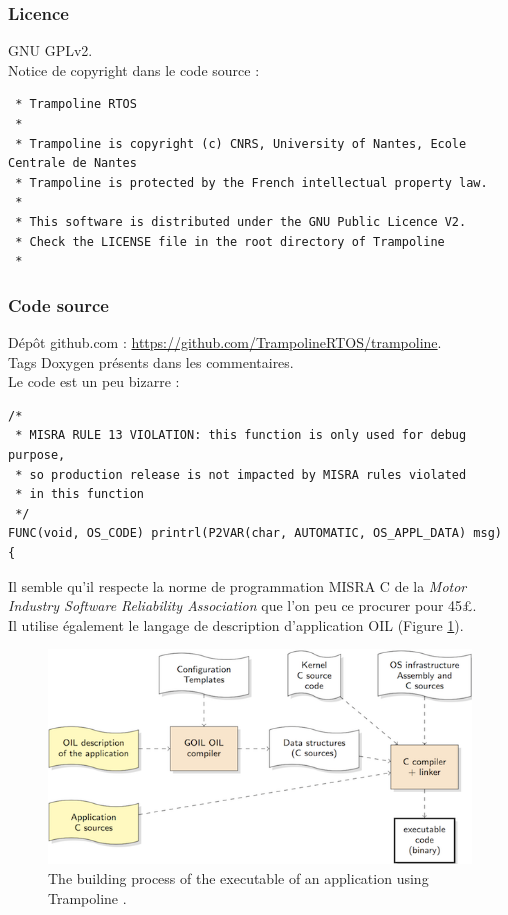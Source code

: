 \subsubsection{Licence}
GNU GPLv2.\\

Notice de copyright dans le code source :
{\small
\begin{verbatim}
 * Trampoline RTOS
 *
 * Trampoline is copyright (c) CNRS, University of Nantes, Ecole Centrale de Nantes
 * Trampoline is protected by the French intellectual property law.
 *
 * This software is distributed under the GNU Public Licence V2.
 * Check the LICENSE file in the root directory of Trampoline
 *
\end{verbatim}
}

\subsubsection{Code source}
Dépôt github.com : \url{https://github.com/TrampolineRTOS/trampoline}.\\

Tags Doxygen présents dans les commentaires.\\

Le code est un peu bizarre :
\begin{verbatim}
/*
 * MISRA RULE 13 VIOLATION: this function is only used for debug purpose,
 * so production release is not impacted by MISRA rules violated
 * in this function
 */
FUNC(void, OS_CODE) printrl(P2VAR(char, AUTOMATIC, OS_APPL_DATA) msg)
{
\end{verbatim}

Il semble qu'il respecte la norme de programmation MISRA C de la \emph{Motor Industry 
Software Reliability Association} que l'on peu ce procurer pour 45£.\\

Il utilise également le langage de description d'application OIL (Figure 
\ref{fig:oil}).

\begin{figure}[!h]
	\begin{center}
		\includegraphics[scale=2.5]{images/trampoline_building.png}
	\end{center}
	\caption[]{\label{fig:oil} The building process of the executable of an
				application using Trampoline \cite{ref7}.}
\end{figure}

